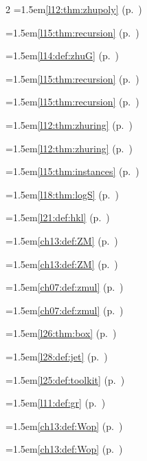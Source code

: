 \begin{multicols}{2}
\hangindent=1.5em\quad \ref{l12:thm:zhupoly} (p.~\pageref{l12:thm:zhupoly})\par
\hangindent=1.5em\quad \ref{l15:thm:recursion} (p.~\pageref{l15:thm:recursion})\par
\hangindent=1.5em\quad \ref{l14:def:zhuG} (p.~\pageref{l14:def:zhuG})\par
\hangindent=1.5em\quad \ref{l15:thm:recursion} (p.~\pageref{l15:thm:recursion})\par
\hangindent=1.5em\quad \ref{l15:thm:recursion} (p.~\pageref{l15:thm:recursion})\par
\hangindent=1.5em\quad \ref{l12:thm:zhuring} (p.~\pageref{l12:thm:zhuring})\par
\hangindent=1.5em\quad \ref{l12:thm:zhuring} (p.~\pageref{l12:thm:zhuring})\par
\hangindent=1.5em\quad \ref{l15:thm:instances} (p.~\pageref{l15:thm:instances})\par
\hangindent=1.5em\quad \ref{l18:thm:logS} (p.~\pageref{l18:thm:logS})\par
\hangindent=1.5em\quad \ref{l21:def:hkl} (p.~\pageref{l21:def:hkl})\par
\hangindent=1.5em\quad \ref{ch13:def:ZM} (p.~\pageref{ch13:def:ZM})\par
\hangindent=1.5em\quad \ref{ch13:def:ZM} (p.~\pageref{ch13:def:ZM})\par
\hangindent=1.5em\quad \ref{ch07:def:zmul} (p.~\pageref{ch07:def:zmul})\par
\hangindent=1.5em\quad \ref{ch07:def:zmul} (p.~\pageref{ch07:def:zmul})\par
\hangindent=1.5em\quad \ref{l26:thm:box} (p.~\pageref{l26:thm:box})\par
\hangindent=1.5em\quad \ref{l28:def:jet} (p.~\pageref{l28:def:jet})\par
\hangindent=1.5em\quad \ref{l25:def:toolkit} (p.~\pageref{l25:def:toolkit})\par
\hangindent=1.5em\quad \ref{l11:def:gr} (p.~\pageref{l11:def:gr})\par
\hangindent=1.5em\quad \ref{ch13:def:Wop} (p.~\pageref{ch13:def:Wop})\par
\hangindent=1.5em\quad \ref{ch13:def:Wop} (p.~\pageref{ch13:def:Wop})\par

\end{multicols}
